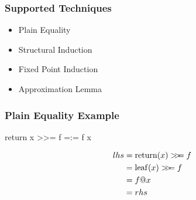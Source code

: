 \documentclass[serif,professionalfont]{beamer}
\begin{document}
%

\begin{frame}[fragile]
\frametitle{Supported Techniques}
\label{sec-4}
\begin{itemize}

\item Plain Equality \\
\item Structural Induction \\
\item Fixed Point Induction \\
\item Approximation Lemma

%
%
%
%

\end{itemize} %
\end{frame}

\begin{frame}[fragile]
\frametitle{Plain Equality Example}

\begin{code}
return x >>= f =:= f x
\end{code}

\begin{align*}
lhs = & \; \bind{\return{x}}{f}        \\
    = & \; \bind{\leaf{x}}{f}          \\
    = & \; f @ x                       \\
    = & \; rhs
\end{align*}


\end{frame}
\end{document}
